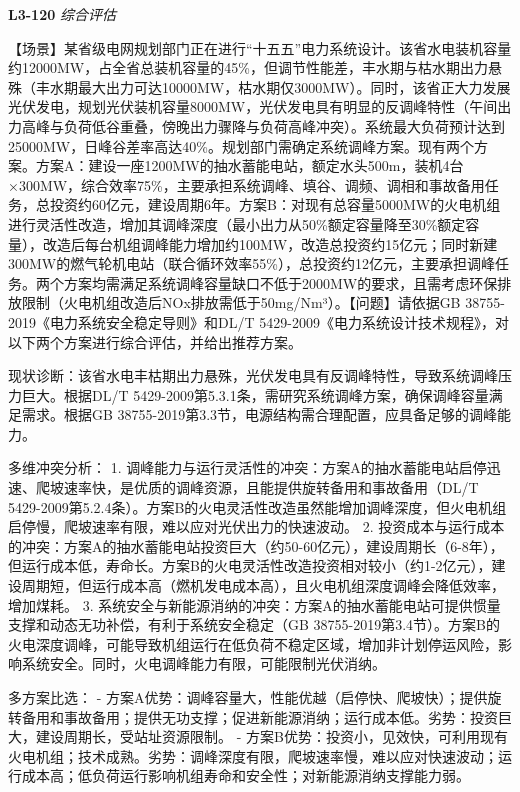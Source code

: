 \documentclass[12pt,a4paper]{ctexart}
\begin{document}
\noindent\textbf{L3-120} \hfill \textit{综合评估}
\begin{description}[leftmargin=1.5em,style=nextline,font=\normalfont]
  \item[Q:] 【场景】某省级电网规划部门正在进行“十五五”电力系统设计。该省水电装机容量约12000MW，占全省总装机容量的45\%，但调节性能差，丰水期与枯水期出力悬殊（丰水期最大出力可达10000MW，枯水期仅3000MW）。同时，该省正大力发展光伏发电，规划光伏装机容量8000MW，光伏发电具有明显的反调峰特性（午间出力高峰与负荷低谷重叠，傍晚出力骤降与负荷高峰冲突）。系统最大负荷预计达到25000MW，日峰谷差率高达40\%。规划部门需确定系统调峰方案。现有两个方案。方案A：建设一座1200MW的抽水蓄能电站，额定水头500m，装机4台×300MW，综合效率75\%，主要承担系统调峰、填谷、调频、调相和事故备用任务，总投资约60亿元，建设周期6年。方案B：对现有总容量5000MW的火电机组进行灵活性改造，增加其调峰深度（最小出力从50\%额定容量降至30\%额定容量），改造后每台机组调峰能力增加约100MW，改造总投资约15亿元；同时新建300MW的燃气轮机电站（联合循环效率55\%），总投资约12亿元，主要承担调峰任务。两个方案均需满足系统调峰容量缺口不低于2000MW的要求，且需考虑环保排放限制（火电机组改造后NOx排放需低于50mg/Nm³）。【问题】请依据GB 38755-2019《电力系统安全稳定导则》和DL/T 5429-2009《电力系统设计技术规程》，对以下两个方案进行综合评估，并给出推荐方案。
  \item[A:] 现状诊断：该省水电丰枯期出力悬殊，光伏发电具有反调峰特性，导致系统调峰压力巨大。根据DL/T 5429-2009第5.3.1条，需研究系统调峰方案，确保调峰容量满足需求。根据GB 38755-2019第3.3节，电源结构需合理配置，应具备足够的调峰能力。

多维冲突分析：
1. 调峰能力与运行灵活性的冲突：方案A的抽水蓄能电站启停迅速、爬坡速率快，是优质的调峰资源，且能提供旋转备用和事故备用（DL/T 5429-2009第5.2.4条）。方案B的火电灵活性改造虽然能增加调峰深度，但火电机组启停慢，爬坡速率有限，难以应对光伏出力的快速波动。
2. 投资成本与运行成本的冲突：方案A的抽水蓄能电站投资巨大（约50-60亿元），建设周期长（6-8年），但运行成本低，寿命长。方案B的火电灵活性改造投资相对较小（约1-2亿元），建设周期短，但运行成本高（燃机发电成本高），且火电机组深度调峰会降低效率，增加煤耗。
3. 系统安全与新能源消纳的冲突：方案A的抽水蓄能电站可提供惯量支撑和动态无功补偿，有利于系统安全稳定（GB 38755-2019第3.4节）。方案B的火电深度调峰，可能导致机组运行在低负荷不稳定区域，增加非计划停运风险，影响系统安全。同时，火电调峰能力有限，可能限制光伏消纳。

多方案比选：
- 方案A优势：调峰容量大，性能优越（启停快、爬坡快）；提供旋转备用和事故备用；提供无功支撑；促进新能源消纳；运行成本低。劣势：投资巨大，建设周期长，受站址资源限制。
- 方案B优势：投资小，见效快，可利用现有火电机组；技术成熟。劣势：调峰深度有限，爬坡速率慢，难以应对快速波动；运行成本高；低负荷运行影响机组寿命和安全性；对新能源消纳支撑能力弱。


\end{description}
\end{document}
